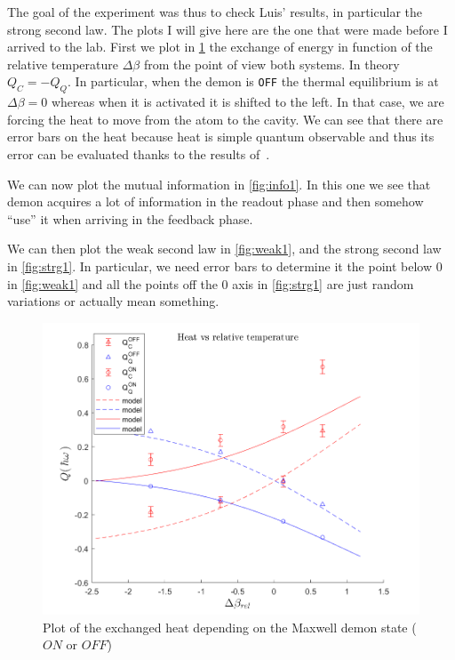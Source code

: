 \documentclass[10pt,a4paper]{report}
\theoremstyle{plain}
\theoremstyle{definition}
\theoremstyle{remark}
\begin{document}
The goal of the experiment was thus to check Luis' results, in particular the
strong second law. The plots I will give here are the one that were made before
I arrived to the lab. First we plot in \cref{fig:heat1} the exchange of energy in function of the
relative temperature $\Delta \beta$ from the point of view both systems.
In theory $Q_C = - Q_Q$. In particular, when the demon is \verb!OFF! the thermal
equilibrium is at $\Delta \beta = 0$ whereas when it is activated it is shifted to
the left. In that case, we are forcing the heat to move from the atom to the cavity. We
can see that there are error bars on the heat because heat is simple quantum
observable and thus its error can be evaluated thanks to the results of~\cite{SPRAL17}.

We can now plot the mutual information in \cref{fig:info1}. In this one we see
that demon acquires a lot of information in the readout phase and then somehow
``use'' it when arriving in the feedback phase.

We can then plot the weak second law in \cref{fig:weak1}, and the strong second
law in \cref{fig:strg1}. In particular, we need error bars to determine it the
point below 0 in \cref{fig:weak1} and all the points off the 0 axis in
\cref{fig:strg1} are just random variations or actually mean something.



\begin{figure}
  \centering
  \includegraphics[height=0.45\textheight]{plots/Heat1.png}
  \caption{Plot of the exchanged heat depending on the Maxwell demon state ($ON$
    or $OFF$)}\label{fig:heat1}
\end{figure}
\end{document}
